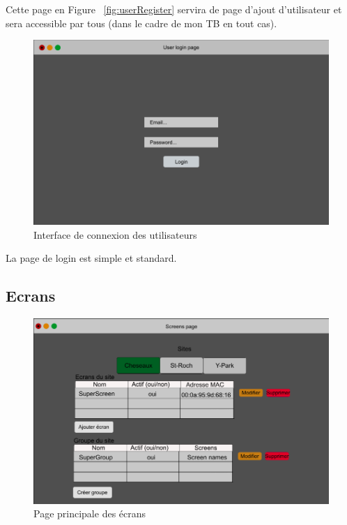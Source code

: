 \documentclass[french]{article}
\begin{document}
\begin{appendices}
	Cette page en Figure ~\ref{fig:userRegister} servira de page d'ajout d'utilisateur et sera accessible par tous (dans le cadre de mon TB en tout cas).
		
	\begin{figure}[h!]
		\centering
		\includegraphics[scale=0.3]{mockup/m_user_login}
		\caption{Interface de connexion des utilisateurs}
		\label{fig:userLogin}
	\end{figure}
	
	La page de login est simple et standard.
	
\newpage
\subsection{Ecrans}
	
	\begin{figure}[h]
		\centering
		\includegraphics[scale=0.3]{mockup/m_screens_page}
		\caption{Page principale des écrans}
		\label{fig:screenPage}
	\end{figure}
	

\end{appendices}
\end{document}
